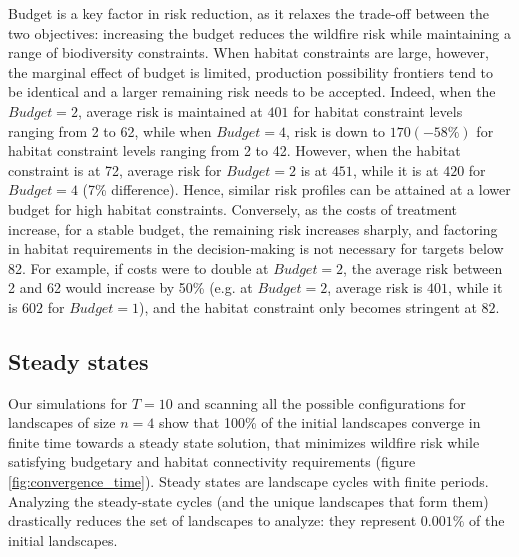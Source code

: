 Budget is a key factor in risk reduction, as it relaxes the trade-off between the two objectives: increasing the budget reduces the wildfire risk while maintaining a range of biodiversity constraints.  When habitat constraints are large, however, the marginal effect of budget is limited, production possibility frontiers tend to be identical and a larger remaining risk needs to be accepted.  Indeed, when the $Budget =2$, average risk is maintained at $401$ for habitat constraint levels ranging from 2 to 62, while when $Budget=4$, risk is down to $170 (-58\%)$ for habitat constraint levels ranging from 2 to 42.  
However, when the habitat constraint is at 72, average risk for $Budget=2$ is at $451$, while it is at $420$ for $Budget=4$ (7\% difference). Hence, similar risk profiles can be attained at a lower budget for high habitat constraints. 
Conversely, as the costs of treatment increase, for a stable budget, the remaining risk increases sharply, and factoring in habitat requirements in the decision-making is not necessary for targets below 82. For example, if costs were to double at $Budget=2$, the average risk between 2 and 62 would increase by 50\% (e.g. at $Budget=2$, average risk is $401$, while it is $602$ for $Budget=1$), and the habitat constraint only becomes stringent at $82$. 

\FloatBarrier
\subsection{Steady states}
Our simulations for $T=10$ and scanning all the possible configurations for landscapes of size $n=4$ show that 100\% of the initial landscapes converge in finite time towards a steady state solution, that minimizes wildfire risk while satisfying budgetary and habitat connectivity requirements (figure \ref{fig:convergence_time}). Steady states are landscape cycles with finite periods. Analyzing the steady-state cycles (and the unique landscapes that form them) drastically reduces the set of landscapes to analyze: they represent $0.001\%$ of the initial landscapes.

